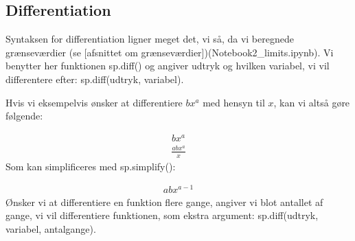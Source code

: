 \documentclass[letterpaper,10pt,english]{jupyterBook}
\begin{document}
\subsection{Differentiation}
\label{\detokenize{notebooks/sympy/Notebook4:differentiation}}
Syntaksen for differentiation ligner meget det, vi så, da vi beregnede grænseværdier (se {[}afsnittet om grænseværdier{]})(Notebook2\_limits.ipynb). Vi benytter her funktionen sp.diff() og angiver udtryk og hvilken variabel, vi vil differentere efter: sp.diff(udtryk, variabel).

Hvis vi eksempelvis ønsker at differentiere \(\displaystyle b x^{a}\) med hensyn til \(x\), kan vi altså gøre følgende:

\begin{sphinxVerbatim}[commandchars=\\\{\}]
                      

        
\end{sphinxVerbatim}
\begin{equation*}
\begin{split}\displaystyle b x^{a}\end{split}
\end{equation*}\begin{equation*}
\begin{split}\displaystyle \frac{a b x^{a}}{x}\end{split}
\end{equation*}
Som kan simplificeres med sp.simplify():

\begin{sphinxVerbatim}[commandchars=\\\{\}]
\end{sphinxVerbatim}
\begin{equation*}
\begin{split}\displaystyle a b x^{a - 1}\end{split}
\end{equation*}
Ønsker vi at differentiere en funktion flere gange, angiver vi blot antallet af gange, vi vil differentiere funktionen, som ekstra argument: sp.diff(udtryk, variabel, antalgange).
\end{document}

